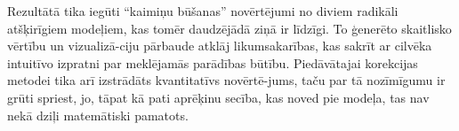 \documentclass[12pt, a4paper]{article}
\numberwithin{equation}{section} %
\begin{document}
Rezultātā tika iegūti ``kaimiņu būšanas'' novērtējumi no diviem radikāli atšķirīgiem modeļiem, kas tomēr daudzējādā ziņā ir līdzīgi. To ģenerēto skaitlisko vērtību un vizualizā-ciju pārbaude atklāj likumsakarības, kas sakrīt ar cilvēka intuitīvo izpratni par meklējamās parādības būtību. Piedāvātajai korekcijas metodei tika arī izstrādāts kvantitatīvs novērtē-jums, taču par tā nozīmīgumu ir grūti spriest, jo, tāpat kā pati aprēķinu secība, kas noved pie modeļa, tas nav nekā dziļi matemātiski pamatots.

\newpage
\printbibliography[title=Atsauces]
\end{document}
